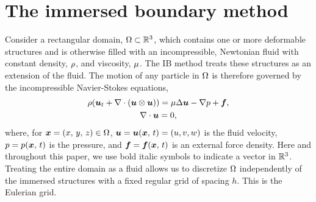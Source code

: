 \section{The immersed boundary method}\label{sec:ib}

Consider a rectangular domain, $\Omega\subset\mathbb{R}^3$, which contains one or more
deformable structures and is otherwise filled with an incompressible, Newtonian fluid
with constant density, $\rho$, and viscosity, $\mu$. The IB method treats
these structures as an extension of the fluid. The motion of any particle in $\Omega$ is
therefore governed by the incompressible Navier-Stokes equations,
\begin{gather}
    \density(\u_t + \div(\u\otimes\u)) = \viscosity\laplacian \u - \grad p + \f, \label{eq:ins-momentum} \\
    \div \u = 0, \label{eq:ins-incomp}
\end{gather}
where, for $\boldsymbol{x} = (x,\,y,\,z) \in \Omega$, $\boldsymbol{u} = \boldsymbol{u}(\boldsymbol{x},\,t) = (u, v, w)$ is the fluid
velocity, $p = p(\boldsymbol{x},\,t)$ is the pressure, and $\boldsymbol{f} = \boldsymbol{f}(\boldsymbol{x},\,t)$ is an external force
density. Here and throughout this paper, we use bold italic symbols to indicate a vector
in $\mathbb{R}^3$. Treating the entire domain as a fluid allows us to discretize $\Omega$
independently of the immersed structures with a fixed regular grid of spacing $h$. This
is the Eulerian grid.


